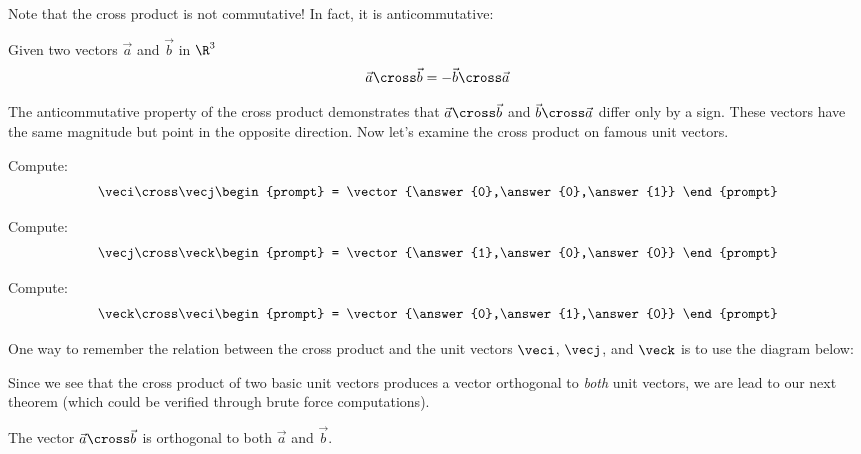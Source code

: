 \documentclass{ximera}
\begin{document}
Note that the cross product is not commutative! In fact, it is
anticommutative:

\begin{theorem}
  Given two vectors $\vec{a}$ and $\vec{b}$ in $\R^3$
  \[
  \vec{a} \cross\vec{b} = -\vec{b}\cross\vec{a}
  \]
\end{theorem}
The anticommutative property of the cross product demonstrates that
$\vec{a}\cross\vec{b}$ and $\vec{b}\cross\vec{a}$ differ only by a
sign. These vectors have the same magnitude but point in the opposite
direction. Now let's examine the cross product on famous unit vectors.
\begin{question}
  Compute:
  \[
  \veci \cross \vecj
  \begin{prompt}
    = \vector{\answer{0},\answer{0},\answer{1}}
  \end{prompt}
  \]
  \begin{question}
  Compute:
  \[
  \vecj\cross\veck 
  \begin{prompt}
    = \vector{\answer{1},\answer{0},\answer{0}}
  \end{prompt}
  \]
  \begin{question}
  Compute:
  \[
  \veck\cross\veci 
  \begin{prompt}
    = \vector{\answer{0},\answer{1},\answer{0}}
  \end{prompt}
  \]
\end{question}
\end{question}
\end{question}

One way to remember the relation between the cross product and the unit vectors $\veci$, $\vecj$, and $\veck$ is to use the diagram below:
\begin{image}[1in]
\end{image}

Since we see that the cross product of two basic unit vectors produces
a vector orthogonal to \textit{both} unit vectors, we are lead to our
next theorem (which could be verified through brute force
computations).

\begin{theorem}
  The vector $\vec{a}\cross\vec{b}$ is orthogonal to both $\vec{a}$
  and $\vec{b}$.
\end{theorem}
\end{document}
